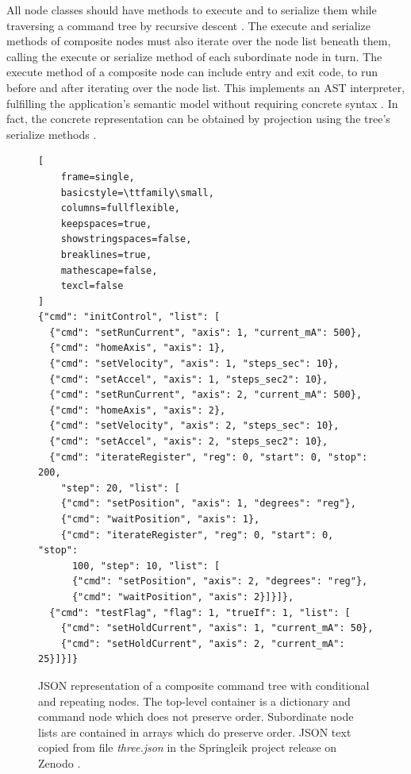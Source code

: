 \documentclass[a4paper,10pt]{article}
\begin{document}
All node classes should have methods to execute and to serialize them while traversing a command tree by recursive descent \cite{2012Wurthinger}. The execute and serialize methods of composite nodes must also iterate over the node list beneath them, calling the execute or serialize method of each subordinate node in turn. The execute method of a composite node can include entry and exit code, to run before and after iterating over the node list. This implements an AST interpreter, fulfilling the application's semantic model without requiring concrete syntax \cite{Knuth}. In fact, the concrete representation can be obtained by projection using the tree's serialize methods \cite{GangOfFour}.

\begin{figure}[t]
\centering
\begin{minipage}{0.9\linewidth}
\begin{lstlisting}[
    frame=single,
    basicstyle=\ttfamily\small,
    columns=fullflexible,
    keepspaces=true,
    showstringspaces=false,
    breaklines=true,
    mathescape=false,
    texcl=false
]
{"cmd": "initControl", "list": [
  {"cmd": "setRunCurrent", "axis": 1, "current_mA": 500},
  {"cmd": "homeAxis", "axis": 1},
  {"cmd": "setVelocity", "axis": 1, "steps_sec": 10},
  {"cmd": "setAccel", "axis": 1, "steps_sec2": 10},
  {"cmd": "setRunCurrent", "axis": 2, "current_mA": 500},
  {"cmd": "homeAxis", "axis": 2},
  {"cmd": "setVelocity", "axis": 2, "steps_sec": 10},
  {"cmd": "setAccel", "axis": 2, "steps_sec2": 10},
  {"cmd": "iterateRegister", "reg": 0, "start": 0, "stop": 200,
    "step": 20, "list": [
    {"cmd": "setPosition", "axis": 1, "degrees": "reg"},
    {"cmd": "waitPosition", "axis": 1},
    {"cmd": "iterateRegister", "reg": 0, "start": 0, "stop":
      100, "step": 10, "list": [
      {"cmd": "setPosition", "axis": 2, "degrees": "reg"},
      {"cmd": "waitPosition", "axis": 2}]}]},
  {"cmd": "testFlag", "flag": 1, "trueIf": 1, "list": [
    {"cmd": "setHoldCurrent", "axis": 1, "current_mA": 50},
    {"cmd": "setHoldCurrent", "axis": 2, "current_mA": 25}]}]}
\end{lstlisting}
\end{minipage}
\caption{JSON representation of a composite command tree with conditional and repeating nodes. The top-level container is a dictionary and command node which does not preserve order. Subordinate node lists are contained in arrays which do preserve order. JSON text copied from file \textit{three.json} in the Springleik project release on Zenodo
\protect\cite{ZenodoPython}.}
\label{treeListing}
\end{figure}
\end{document}
